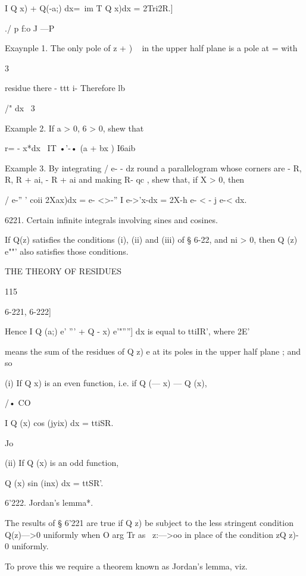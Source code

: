 I Q x) + Q(-a;) dx=\ im T Q x)dx = 2Tri2R.]

./ p f:o J —P

Exaynple 1. The only pole of z + ) ~ in the upper half plane is a pole
at = with



3

residue there - ttt i- Therefore lb



/" dx \ 3

Example 2. If a > 0, 6 > 0, shew that

r= - x*dx \ IT •'-• (a + bx ) I6aib

Example 3. By integrating / e- - dz round a parallelogram whose
corners are - R, R, R + ai, - R + ai and making R- qc , shew that, if
X > 0, then

/ e-'' ' coii 2Xax)dx = e- <>-'' I e->'x-dx = 2X-h e- < - j e-< dx.

6221. Certain infinite integrals involving sines and cosines.

If Q(z) satisfies the conditions (i), (ii) and (iii) of § 6-22, and ni
> 0, then Q (z) e""' also satisfies those conditions.



THE THEORY OF RESIDUES



115



6-221, 6-222]

Hence I Q (a;) e' ''' + Q - x) e'"''''] dx is equal to ttiIR', where
2E'

means the sum of the residues of Q z) e at its poles in the upper half
plane ; and so

(i) If Q x) is an even function, i.e. if Q (— x) — Q (x),

/• CO

I Q (x) cos (jyix) dx = ttiSR.

Jo

(ii) If Q (x) is an odd function,

Q (x) sin (inx) dx = ttSR'.



6'222. Jordan's lemma*.

The results of § 6'221 are true if Q z) be subject to the less
stringent condition Q(z)—>0 uniformly when O arg Tr as \ z:—>oo in
place of the condition zQ z)- 0 uniformly.

To prove this we require a theorem known as Jordan's lemma, viz.

